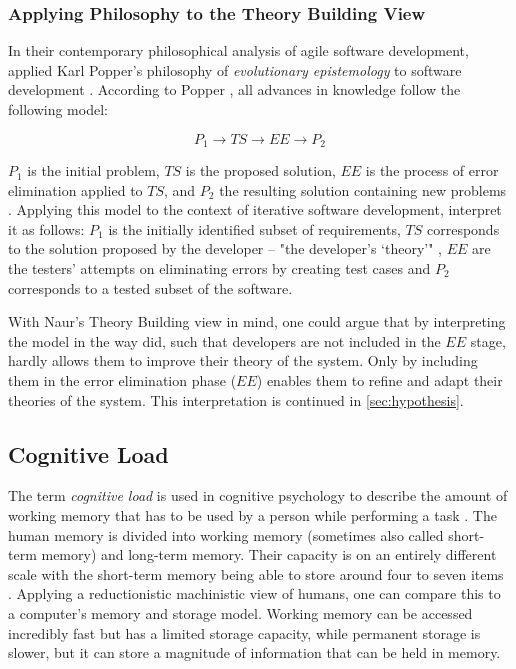 \subsubsection{Applying Philosophy to the Theory Building View}

In their contemporary philosophical analysis of agile software development, \citeauthor{northover_agile_2007} applied Karl Popper's philosophy of \emph{evolutionary epistemology} to software development \cite{northover_agile_2007}.
According to Popper \cite{northover_karl_2006}, all advances in knowledge follow the following model:

\[P_1 \rightarrow TS \rightarrow EE \rightarrow P_2\]

$P_1$ is the initial problem, $TS$ is the proposed solution, $EE$ is the process of error elimination applied to $TS$, and $P_2$ the resulting solution containing new problems \cite{northover_karl_2006}.
Applying this model to the context of iterative software development, \citeauthor{northover_agile_2007} interpret it as follows: $P_1$ is the initially identified subset of requirements, $TS$ corresponds to the solution proposed by the developer -- "the developer's `theory'" \cite{northover_agile_2007}, $EE$ are the testers' attempts on eliminating errors by creating test cases and $P_2$ corresponds to a tested subset of the software.

With Naur's Theory Building view in mind, one could argue that by interpreting the model in the way \citeauthor{northover_agile_2007} did, such that developers are not included in the $EE$ stage, hardly allows them to improve their theory of the system.
Only by including them in the error elimination phase ($EE$) enables them to refine and adapt their theories of the system.
This interpretation is continued in \ref{sec:hypothesis}.


\subsection{Cognitive Load}
\label{sec:cognitive-load}
The term \emph{cognitive load} is used in cognitive psychology to describe the amount of working memory that has to be used by a person while performing a task \cite{shaw_memory_2016}.
The human memory is divided into working memory (sometimes also called short-term memory) and long-term memory.
Their capacity is on an entirely different scale \cite{seemann_code_2021} with the short-term memory being able to store around four to seven items \cite{shaw_memory_2016}.
Applying a reductionistic machinistic view of humans, one can compare this to a computer's memory and storage model.
Working memory can be accessed incredibly fast but has a limited storage capacity, while permanent storage is slower, but it can store a magnitude of information that can be held in memory.


